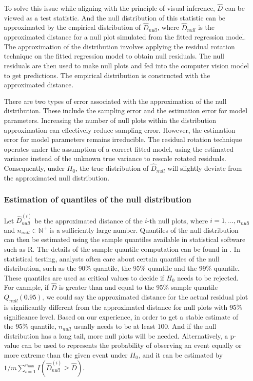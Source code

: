 \documentclass[]{interact}
\theoremstyle{plain}%
\theoremstyle{definition}
\theoremstyle{remark}
\begin{document}
To solve this issue while aligning with the principle of visual
inference, \(\hat{D}\) can be viewed as a test statistic. And the null
distribution of this statistic can be approximated by the empirical
distribution of \(\hat{D}_{null}\), where \(\hat{D}_{null}\) is the
approximated distance for a null plot simulated from the fitted
regression model. The approximation of the distribution involves
applying the residual rotation technique \citep{buja2009statistical} on
the fitted regression model to obtain null residuals. The null residuals
are then used to make null plots and fed into the computer vision model
to get predictions. The empirical distribution is constructed with the
approximated distance.

There are two types of error associated with the approximation of the
null distribution. These include the sampling error and the estimation
error for model parameters. Increasing the number of null plots within
the distribution approximation can effectively reduce sampling error.
However, the estimation error for model parameters remains irreducible.
The residual rotation technique operates under the assumption of a
correct fitted model, using the estimated variance instead of the
unknown true variance to rescale rotated residuals. Consequently, under
\(H_0\), the true distribution of \(\hat{D}_{null}\) will slightly
deviate from the approximated null distribution.

\hypertarget{estimation-of-quantiles-of-the-null-distribution}{%
\subsubsection{Estimation of quantiles of the null
distribution}\label{estimation-of-quantiles-of-the-null-distribution}}

Let \(\hat{D}_{null}^{(i)}\) be the approximated distance of the
\(i\)-th null plots, where \(i = 1,...,n_{null}\) and
\(n_{null} \in \mathbb{N}^+\) is a sufficiently large number. Quantiles
of the null distribution can then be estimated using the sample
quantiles available in statistical software such as R. The details of
the sample quantile computation can be found in
\citet{hyndman1996sample}. In statistical testing, analysts often care
about certain quantiles of the null distribution, such as the 90\%
quantile, the 95\% quantile and the 99\% quantile. These quantiles are
used as critical values to decide if \(H_0\) needs to be rejected. For
example, if \(\hat{D}\) is greater than and equal to the 95\% sample
quantile \(Q_{null}(0.95)\), we could say the approximated distance for
the actual residual plot is significantly different from the
approximated distance for null plots with 95\% significance level. Based
on our experience, in order to get a stable estimate of the 95\%
quantile, \(n_{null}\) usually needs to be at least \(100\). And if the
null distribution has a long tail, more null plots will be needed.
Alternatively, a p-value can be used to represents the probability of
observing an event equally or more extreme than the given event under
\(H_0\), and it can be estimated by
\(1/m\sum_{i=1}^{n_{null}}I\left(\hat{D}_{null}^{(i)} \geq \hat{D}\right)\).
\end{document}
